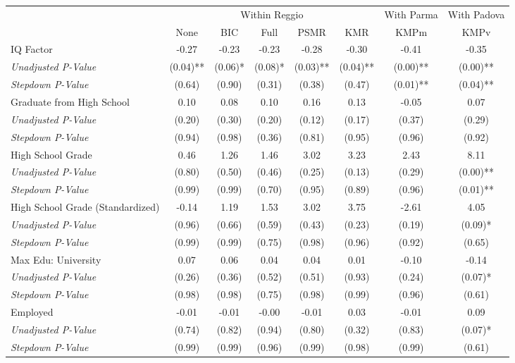 \begin{tabular}{l c c c c c c c}
\toprule
& \multicolumn{5}{c}{Within Reggio} & With Parma & With Padova \\\cmidrule(lr){2-6} \cmidrule(lr){7-7} \cmidrule(lr){8-8}
 & None & BIC & Full & PSMR & KMR & KMPm & KMPv \\
\midrule
IQ Factor & -0.27 & -0.23 & -0.23 & -0.28 & -0.30 & -0.41 & -0.35 \\
\quad \textit{Unadjusted P-Value} & (0.04)** & (0.06)* & (0.08)* & (0.03)** & (0.04)** & (0.00)** & (0.00)** \\
\quad \textit{Stepdown P-Value} & (0.64) & (0.90) & (0.31) & (0.38) & (0.47) & (0.01)** & (0.04)** \\
Graduate from High School & 0.10 & 0.08 & 0.10 & 0.16 & 0.13 & -0.05 & 0.07 \\
\quad \textit{Unadjusted P-Value} & (0.20) & (0.30) & (0.20) & (0.12) & (0.17) & (0.37) & (0.29) \\
\quad \textit{Stepdown P-Value} & (0.94) & (0.98) & (0.36) & (0.81) & (0.95) & (0.96) & (0.92) \\
High School Grade & 0.46 & 1.26 & 1.46 & 3.02 & 3.23 & 2.43 & 8.11 \\
\quad \textit{Unadjusted P-Value} & (0.80) & (0.50) & (0.46) & (0.25) & (0.13) & (0.29) & (0.00)** \\
\quad \textit{Stepdown P-Value} & (0.99) & (0.99) & (0.70) & (0.95) & (0.89) & (0.96) & (0.01)** \\
High School Grade (Standardized) & -0.14 & 1.19 & 1.53 & 3.02 & 3.75 & -2.61 & 4.05 \\
\quad \textit{Unadjusted P-Value} & (0.96) & (0.66) & (0.59) & (0.43) & (0.23) & (0.19) & (0.09)* \\
\quad \textit{Stepdown P-Value} & (0.99) & (0.99) & (0.75) & (0.98) & (0.96) & (0.92) & (0.65) \\
Max Edu: University & 0.07 & 0.06 & 0.04 & 0.04 & 0.01 & -0.10 & -0.14 \\
\quad \textit{Unadjusted P-Value} & (0.26) & (0.36) & (0.52) & (0.51) & (0.93) & (0.24) & (0.07)* \\
\quad \textit{Stepdown P-Value} & (0.98) & (0.98) & (0.75) & (0.98) & (0.99) & (0.96) & (0.61) \\
Employed & -0.01 & -0.01 & -0.00 & -0.01 & 0.03 & -0.01 & 0.09 \\
\quad \textit{Unadjusted P-Value} & (0.74) & (0.82) & (0.94) & (0.80) & (0.32) & (0.83) & (0.07)* \\
\quad \textit{Stepdown P-Value} & (0.99) & (0.99) & (0.96) & (0.99) & (0.98) & (0.99) & (0.61) \\

\end{tabular}
